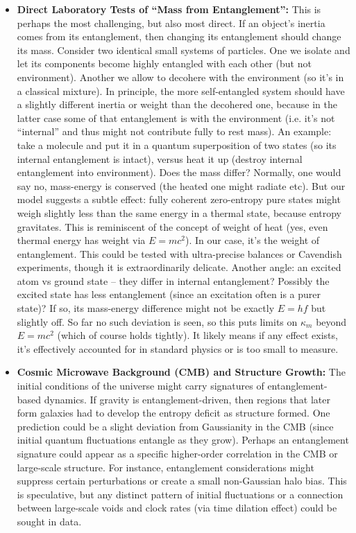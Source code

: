 \documentclass[11pt]{article}
\begin{document}
\begin{itemize}
    \item \textbf{Direct Laboratory Tests of “Mass from Entanglement”:} This is perhaps the most challenging, but also most direct. If an object’s inertia comes from its entanglement, then changing its entanglement should change its mass. Consider two identical small systems of particles. One we isolate and let its components become highly entangled with each other (but not environment). Another we allow to decohere with the environment (so it’s in a classical mixture). In principle, the more self-entangled system should have a slightly different inertia or weight than the decohered one, because in the latter case some of that entanglement is with the environment (i.e. it’s not “internal” and thus might not contribute fully to rest mass). An example: take a molecule and put it in a quantum superposition of two states (so its internal entanglement is intact), versus heat it up (destroy internal entanglement into environment). Does the mass differ? Normally, one would say no, mass-energy is conserved (the heated one might radiate etc). But our model suggests a subtle effect: fully coherent zero-entropy pure states might weigh slightly less than the same energy in a thermal state, because entropy gravitates. This is reminiscent of the concept of weight of heat (yes, even thermal energy has weight via $E=mc^2$). In our case, it’s the weight of entanglement. This could be tested with ultra-precise balances or Cavendish experiments, though it is extraordinarily delicate. Another angle: an excited atom vs ground state – they differ in internal entanglement? Possibly the excited state has less entanglement (since an excitation often is a purer state)? If so, its mass-energy difference might not be exactly $E=hf$ but slightly off. So far no such deviation is seen, so this puts limits on $\kappa_m$ beyond $E=mc^2$ (which of course holds tightly). It likely means if any effect exists, it’s effectively accounted for in standard physics or is too small to measure.

    \item \textbf{Cosmic Microwave Background (CMB) and Structure Growth:} The initial conditions of the universe might carry signatures of entanglement-based dynamics. If gravity is entanglement-driven, then regions that later form galaxies had to develop the entropy deficit as structure formed. One prediction could be a slight deviation from Gaussianity in the CMB (since initial quantum fluctuations entangle as they grow). Perhaps an entanglement signature could appear as a specific higher-order correlation in the CMB or large-scale structure. For instance, entanglement considerations might suppress certain perturbations or create a small non-Gaussian halo bias. This is speculative, but any distinct pattern of initial fluctuations or a connection between large-scale voids and clock rates (via time dilation effect) could be sought in data.


\end{itemize}
\end{document}
